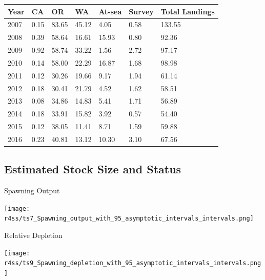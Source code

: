 \documentclass[pdf]{beamer}\usepackage[]{graphicx}\usepackage[]{color}
\begin{document}
\begin{frame}[t]
  \begin{table}[ht]
  \centering
  \begin{tabular}{p{0.4in}p{0.4in}p{0.4in}p{0.4in}p{0.4in}p{0.4in}p{0.6in}}
  Year & CA & OR & WA & At-sea & Survey & Total Landings \\ 
  \hline
  2007 & 0.15 & 83.65 & 45.12 & 4.05 & 0.58 & 133.55 \\ 
  2008 & 0.39 & 58.64 & 16.61 & 15.93 & 0.80 & 92.36 \\ 
  2009 & 0.92 & 58.74 & 33.22 & 1.56 & 2.72 & 97.17 \\ 
  2010 & 0.14 & 58.00 & 22.29 & 16.87 & 1.68 & 98.98 \\ 
  2011 & 0.12 & 30.26 & 19.66 & 9.17 & 1.94 & 61.14 \\ 
  2012 & 0.18 & 30.41 & 21.79 & 4.52 & 1.62 & 58.51 \\ 
  2013 & 0.08 & 34.86 & 14.83 & 5.41 & 1.71 & 56.89 \\ 
  2014 & 0.18 & 33.91 & 15.82 & 3.92 & 0.57 & 54.40 \\ 
  2015 & 0.12 & 38.05 & 11.41 & 8.71 & 1.59 & 59.88 \\ 
  2016 & 0.23 & 40.81 & 13.12 & 10.30 & 3.10 & 67.56 \\ 
  \hline
  \end{tabular}
  \end{table}
\end{frame}


\subsection{Estimated Stock Size and Status}
\begin{frame}{Spawning Output}
  \begin{center}
    \texttt{[image: r4ss/ts7\_Spawning\_output\_with\_95\_asymptotic\_intervals\_intervals.png]}
  \end{center}
\end{frame}


\begin{frame}{Relative Depletion}
  \begin{center}
    \texttt{[image: r4ss/ts9\_Spawning\_depletion\_with\_95\_asymptotic\_intervals\_intervals.png]}
  \end{center}
\end{frame}
\end{document}
